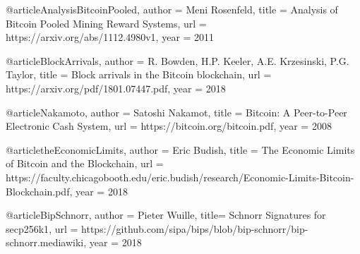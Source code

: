 @article{AnalysisBitcoinPooled,
  author = {Meni Rosenfeld},
  title  = {Analysis of Bitcoin Pooled Mining Reward Systems},
  url    = {https://arxiv.org/abs/1112.4980v1},
  year   = {2011}
}

@article{BlockArrivals,
  author = {R. Bowden, H.P. Keeler, A.E. Krzesinski, P.G. Taylor},
  title  = {Block arrivals in the Bitcoin blockchain},
  url    = {https://arxiv.org/pdf/1801.07447.pdf},
  year   = {2018}
}

@article{Nakamoto,
  author = {Satoshi Nakamot},
  title  = {Bitcoin: A Peer-to-Peer Electronic Cash System},
  url    = {https://bitcoin.org/bitcoin.pdf},
  year   = {2008}
}

@article{theEconomicLimits,
  author = {Eric Budish},
  title  = {The Economic Limits of Bitcoin and the Blockchain},
  url    = {https://faculty.chicagobooth.edu/eric.budish/research/Economic-Limits-Bitcoin-Blockchain.pdf},
  year   = {2018}
}

@article{BipSchnorr,
  author = {Pieter Wuille},
  title= {Schnorr Signatures for secp256k1},
  url    = {https://github.com/sipa/bips/blob/bip-schnorr/bip-schnorr.mediawiki},
  year   = {2018}
}